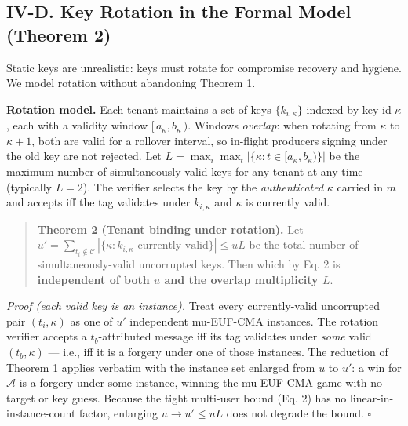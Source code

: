 \subsection{IV-D. Key Rotation in the Formal Model (Theorem
2)}\label{iv-d-key-rotation-in-the-formal-model-theorem-2}

Static keys are unrealistic: keys must rotate for compromise recovery
and hygiene. We model rotation without abandoning Theorem 1.

\textbf{Rotation model.} Each tenant maintains a set of keys
\(\{k_{i,\kappa}\}\) indexed by key-id \(\kappa\), each with a validity
window \([\,a_\kappa, b_\kappa\,)\). Windows \emph{overlap}: when
rotating from \(\kappa\) to \(\kappa+1\), both are valid for a rollover
interval, so in-flight producers signing under the old key are not
rejected. Let \(L=\max_i \max_t |\{\kappa : t\in[a_\kappa,b_\kappa)\}|\)
be the maximum number of simultaneously valid keys for any tenant at any
time (typically \(L=2\)). The verifier selects the key by the
\emph{authenticated} \(\kappa\) carried in \(m\) and accepts iff the tag
validates under \(k_{i,\kappa}\) and \(\kappa\) is currently valid.

\begin{quote}
\textbf{Theorem 2 (Tenant binding under rotation).} Let
\(u'=\sum_{t_i\notin\mathcal{C}}
|\{\kappa : k_{i,\kappa}\text{ currently valid}\}| \le uL\) be the total
number of simultaneously-valid uncorrupted keys. Then
which by Eq. 2 is \textbf{independent of both \(u\) and the overlap
multiplicity \(L\)}.
\end{quote}

\emph{Proof (each valid key is an instance).} Treat every
currently-valid uncorrupted pair \((t_i,\kappa)\) as one of \(u'\)
independent mu-EUF-CMA instances. The rotation verifier accepts a
\(t_b\)-attributed message iff its tag validates under \emph{some} valid
\((t_b,\kappa)\) --- i.e., iff it is a forgery under one of those
instances. The reduction of Theorem 1 applies verbatim with the instance
set enlarged from \(u\) to \(u'\): a win for \(\mathcal{A}\) is a
forgery under some instance, winning the mu-EUF-CMA game with no target
or key guess. Because the tight multi-user bound (Eq. 2) has no
linear-in-instance-count factor, enlarging \(u\to u'\le uL\) does not
degrade the bound. \(\square\)

